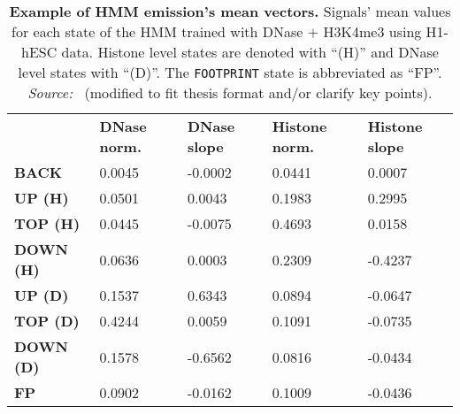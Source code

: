 \begin{table}[t]
\footnotesize
\begin{center}
\caption[Example of HMM emission's mean vectors]{\textbf{Example of HMM emission's mean vectors.} Signals' mean values for each state of the HMM trained with DNase $+$ H3K4me3 using H1-hESC data. Histone level states are denoted with ``(H)'' and DNase level states with ``(D)''. The {\tt FOOTPRINT} state is abbreviated as ``FP''. \emph{Source:~\cite{gusmao2014}} (modified to fit thesis format and/or clarify key points).}
\label{tab:hmmmean}
    \renewcommand{\arraystretch}{1.2}
    \begin{tabular}{ lllll }
        \hline
        & \textbf{DNase norm.} & \textbf{DNase slope} & \textbf{Histone norm.} & \textbf{Histone slope} \\
        \textbf{BACK}     & 0.0045 & -0.0002 & 0.0441 & 0.0007  \\
        \textbf{UP (H)}   & 0.0501 & 0.0043  & 0.1983 & 0.2995  \\
        \textbf{TOP (H)}  & 0.0445 & -0.0075 & 0.4693 & 0.0158  \\
        \textbf{DOWN (H)} & 0.0636 & 0.0003  & 0.2309 & -0.4237 \\
        \textbf{UP (D)}   & 0.1537 & 0.6343  & 0.0894 & -0.0647 \\
        \textbf{TOP (D)}  & 0.4244 & 0.0059  & 0.1091 & -0.0735 \\
        \textbf{DOWN (D)} & 0.1578 & -0.6562 & 0.0816 & -0.0434 \\
        \textbf{FP}       & 0.0902 & -0.0162 & 0.1009 & -0.0436 \\
        \hline
    \end{tabular}
\end{center}
\end{table}



